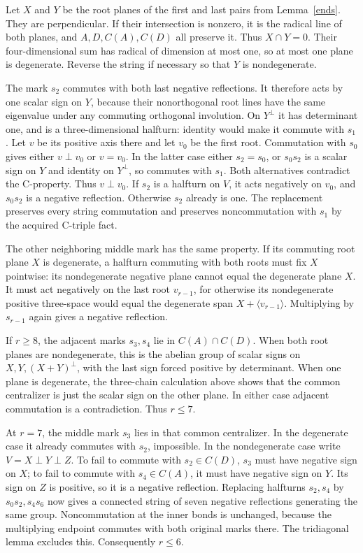 \documentclass[11pt,a4paper]{article}
\newcommand{\gen}[1]{\langle#1\rangle}\newcommand{\Om}{\Omega}
\begin{document}
Let $X$ and $Y$ be the root planes of the first and last pairs from
Lemma~\ref{ends}. They are perpendicular. If their intersection is
nonzero, it is the radical line of both planes, and $A,D,C(A),C(D)$
all preserve it. Thus $X\cap Y=0$. Their four-dimensional sum has
radical of dimension at most one, so at most one plane is degenerate.
Reverse the string if necessary so that $Y$ is nondegenerate.

The mark $s_2$ commutes with both last negative reflections. It therefore
acts by one scalar sign on $Y$, because their nonorthogonal root lines
have the same eigenvalue under any commuting orthogonal involution.
On $Y^\perp$ it has determinant one, and is a three-dimensional
halfturn: identity would make it commute with $s_1$.
Let $v$ be its positive axis there and let $v_0$ be the first root.
Commutation with $s_0$ gives either $v\perp v_0$ or $v=v_0$.
In the latter case either $s_2=s_0$, or $s_0s_2$ is a scalar sign
on $Y$ and identity on $Y^\perp$, so commutes with $s_1$.
Both alternatives contradict the C-property. Thus $v\perp v_0$.
If $s_2$ is a halfturn on $V$, it acts negatively on $v_0$,
and $s_0s_2$ is a negative reflection. Otherwise $s_2$ already is
one. The replacement preserves every string commutation and preserves
noncommutation with $s_1$ by the acquired C-triple fact.

The other neighboring middle mark has the same property. If its
commuting root plane $X$ is degenerate, a halfturn commuting with
both roots must fix $X$ pointwise: its nondegenerate negative plane
cannot equal the degenerate plane $X$. It must act negatively on the
last root $v_{r-1}$, for otherwise its nondegenerate positive
three-space would equal the degenerate span $X+\gen{v_{r-1}}$.
Multiplying by $s_{r-1}$ again gives a negative reflection.

If $r\ge8$, the adjacent marks $s_3,s_4$ lie in $C(A)\cap C(D)$.
When both root planes are nondegenerate, this is the abelian group of
scalar signs on $X,Y,(X+Y)^\perp$, with the last sign forced positive
by determinant. When one plane is degenerate, the three-chain
calculation above shows that the common centralizer is just the scalar
sign on the other plane. In either case adjacent commutation is a
contradiction. Thus $r\le7$.

At $r=7$, the middle mark $s_3$ lies in that common centralizer.
In the degenerate case it already commutes with $s_2$, impossible.
In the nondegenerate case write $V=X\perp Y\perp Z$. To fail to
commute with $s_2\in C(D)$, $s_3$ must have negative sign on $X$;
to fail to commute with $s_4\in C(A)$, it must have negative sign
on $Y$. Its sign on $Z$ is positive, so it is a negative reflection.
Replacing halfturns $s_2,s_4$ by $s_0s_2,s_4s_6$ now gives a
connected string of seven negative reflections generating the same
group. Noncommutation at the inner bonds is unchanged, because the
multiplying endpoint commutes with both original marks there.
The tridiagonal lemma excludes this. Consequently $r\le6$.
\end{document}
